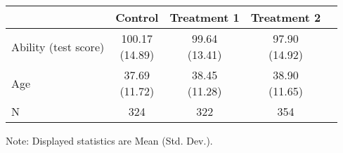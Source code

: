 \renewcommand\cellalign{t}
\begin{threeparttable}
\begin{tabular}{lcccc}
\toprule
 & Control & Treatment 1 & Treatment 2 \\
\midrule
\addlinespace
Ability (test score) & \makecell{100.17\\(14.89)} & \makecell{99.64\\(13.41)} & \makecell{97.90\\(14.92)} \\
Age & \makecell{37.69\\(11.72)} & \makecell{38.45\\(11.28)} & \makecell{38.90\\(11.65)} \\
\midrule
\addlinespace
N & 324 & 322 & 354 \\
\bottomrule
\end{tabular}
\footnotesize Note: Displayed statistics are Mean (Std. Dev.).
\end{threeparttable}